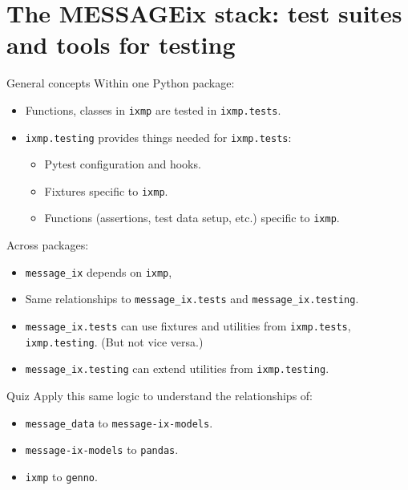 \documentclass[12pt,aspectratio=169]{beamer}
\renewcommand{\mod}[1]{\texttt{#1}}
\begin{document}
\section{The MESSAGEix stack: test suites and tools for testing}
\begin{frame}[fragile]{General concepts}
Within one Python package:
\begin{itemize}
  \item Functions, classes in \mod{ixmp} are tested in \mod{ixmp.tests}.
  \item \mod{ixmp.testing} provides things needed for \mod{ixmp.tests}:
  \begin{itemize}
    \item Pytest configuration and hooks.
    \item Fixtures specific to \mod{ixmp}.
    \item Functions (assertions, test data setup, etc.) specific to \mod{ixmp}.
  \end{itemize}
\end{itemize}

\medskip
Across packages:
\begin{itemize}
  \item \mod{message_ix} depends on \mod{ixmp}, 
  \item Same relationships to \mod{message_ix.tests} and \mod{message_ix.testing}.
  \item \mod{message_ix.tests} can use fixtures and utilities from \mod{ixmp.tests}, \mod{ixmp.testing}. (But not vice versa.)
  \item \mod{message_ix.testing} can extend utilities from \mod{ixmp.testing}.
\end{itemize}
\end{frame}

\begin{frame}{Quiz}
Apply this same logic to understand the relationships of:

\begin{itemize}
  \item \mod{message_data} to \mod{message-ix-models}.
  \item \mod{message-ix-models} to \mod{pandas}.
  \item \mod{ixmp} to \mod{genno}.
\end{itemize}  
\end{frame}
\end{document}
